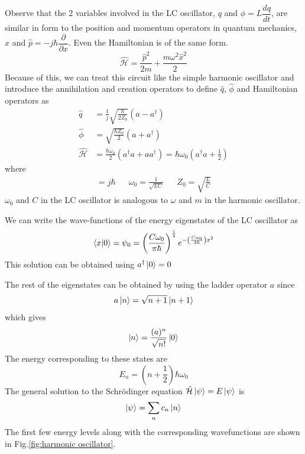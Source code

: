 Observe that the 2 variables involved in the LC oscillator, $q$ and $\phi=L\dfrac{dq}{dt}$, are similar in form to the position and momentum operators in quantum mechanics, $\hat{x}$ and $\hat{p}=-j\hbar\dfrac{\partial}{\partial x}$. Even the Hamiltonian is of the same form.\parencite{Devoret1995}
\begin{equation}
\hat{\mathcal{H}}=\frac{\hat{p}^2}{2m}+\frac{m\omega^2\hat{x}^2}{2}
\end{equation}
Because of this, we can treat this circuit like the simple harmonic oscillator and introduce the annihilation and creation operators to define $\hat{q}$, $\hat{\phi}$ and Hamiltonian operators as
\begin{subequations}
\begin{align}
\hat{q}&=\frac{1}{j}\sqrt{\frac{\hbar}{2Z_0}}(a-a^\dag)\\
\hat{\phi}&=\sqrt{\frac{\hbar Z_0}{2}}(a+a^\dag)\\
\hat{\mathcal{H}}&=\frac{\hbar\omega_0}{2}(a^\dag a+aa^\dag)=\hbar\omega_0\left(a^\dag a + \frac{1}{2}\right)
\end{align}
\end{subequations}
where
\begin{align*}
[\hat{\phi},\hat{q}]=j\hbar&&
\omega_0=\frac{1}{\sqrt{LC}}&&
Z_0=\sqrt{\frac{L}{C}}
\end{align*}
$\omega_0$ and $C$ in the LC oscillator is analogous to $\omega$ and $m$ in the harmonic oscillator.

We can write the wave-functions of the energy eigenstates of the LC oscillator as
\begin{equation}
\bra{x}\ket{0}=\psi_0=\left(\frac{C\omega_0}{\pi\hbar}\right)^\frac{1}{4}e^{-\left(\frac{C\omega_0}{2\hbar}\right)x^2}
\end{equation}
This solution can be obtained using $a^\dag\ket{0}=0$

The rest of the eigenstates can be obtained by using the ladder operator $a$ since
\begin{equation}
a\ket{n}=\sqrt{n+1}\ket{n+1}
\end{equation}
which gives
\begin{equation}
\ket{n}=\frac{(a)^n}{\sqrt{n!}}\ket{0}
\end{equation}
The energy corresponding to these states are
\begin{equation}
E_n=\left(n+\frac{1}{2}\right)\hbar\omega_0
\end{equation}
The general solution to the Schr\"{o}dinger equation $\hat{\mathcal{H}}\ket{\psi}=E\ket{\psi}$ is
\begin{equation}
\ket{\psi}=\sum_nc_n\ket{n}
\end{equation}
The first few energy levels along with the corresponding wavefunctions are shown in Fig.\ref{fig:harmonic oscillator}.

